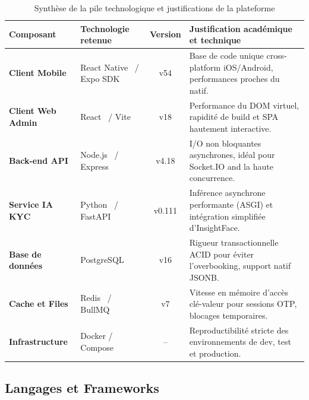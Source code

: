 \begin{landscape}
\begin{table}[H]
\centering
\renewcommand{\arraystretch}{1.4}
\begin{tabularx}{\linewidth}{|l|l|c|X|}
\hline
\rowcolor{rohlight}
\textbf{Composant} & \textbf{Technologie retenue} & \textbf{Version} & \textbf{Justification académique et technique} \\
\hline
\textbf{Client Mobile} & React Native~\cite{reactnative_docs} / Expo SDK~\cite{expo_docs} & v54 & Base de code unique cross-platform iOS/Android, performances proches du natif. \\
\hline
\textbf{Client Web Admin} & React~\cite{react_docs} / Vite~\cite{vite_docs} & v18 & Performance du DOM virtuel, rapidité de build et SPA hautement interactive. \\
\hline
\textbf{Back-end API} & Node.js~\cite{nodejs_docs} / Express~\cite{express_docs} & v4.18 & I/O non bloquantes asynchrones, idéal pour Socket.IO and la haute concurrence. \\
\hline
\textbf{Service IA KYC} & Python~\cite{python_docs} / FastAPI~\cite{fastapi_docs} & v0.111 & Inférence asynchrone performante (ASGI) et intégration simplifiée d'InsightFace. \\
\hline
\textbf{Base de données} & PostgreSQL~\cite{postgres_docs} & v16 & Rigueur transactionnelle ACID pour éviter l'overbooking, support natif JSONB. \\
\hline
\textbf{Cache et Files} & Redis~\cite{redis_docs} / BullMQ~\cite{bullmq_docs} & v7 & Vitesse en mémoire d'accès clé-valeur pour sessions OTP, blocages temporaires. \\
\hline
\textbf{Infrastructure} & Docker / Compose~\cite{docker_docs} & -- & Reproductibilité stricte des environnements de dev, test et production. \\
\hline
\end{tabularx}
\caption{Synthèse de la pile technologique et justifications de la plateforme}
\label{tab:pile-technologique}
\end{table}
\end{landscape}

\subsection{Langages et Frameworks}

